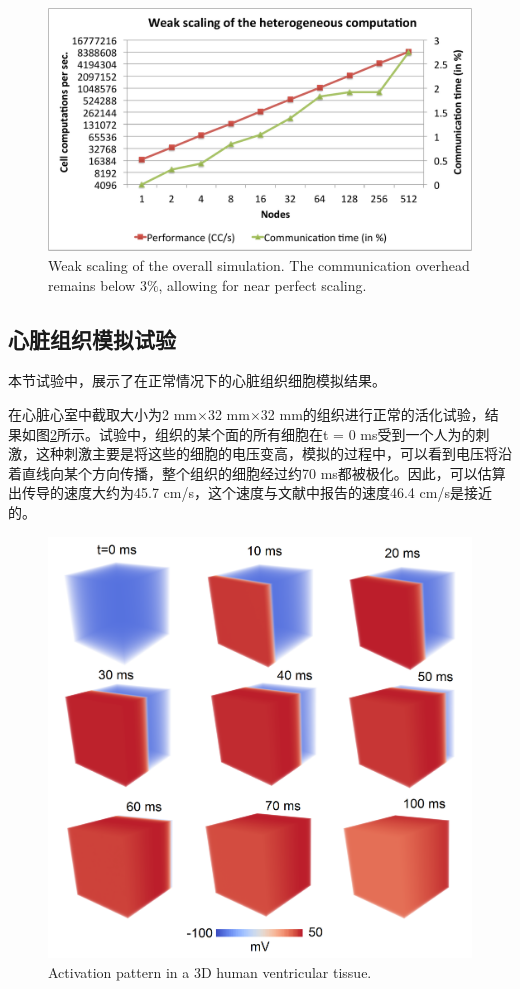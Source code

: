 \begin{figure}
 \includegraphics[width=\linewidth]{figs/weakscaling.pdf}
  \caption{Weak scaling of the overall simulation. The communication overhead remains below $3\%$, allowing for near perfect scaling.}
  \label{weak_scale}
\end{figure}

\subsection{心脏组织模拟试验}
本节试验中，展示了在正常情况下的心脏组织细胞模拟结果。

在心脏心室中截取大小为2 mm$\times$32 mm$\times$32 mm的组织进行正常的活化试验，结果如图\ref{fig:activation}所示。试验中，组织的某个面的所有细胞在t = 0 ms受到一个人为的刺激，这种刺激主要是将这些的细胞的电压变高，模拟的过程中，可以看到电压将沿着直线向某个方向传播，整个组织的细胞经过约70 ms都被极化。因此，可以估算出传导的速度大约为45.7 cm/s，这个速度与文献中报告的速度46.4 cm/s是接近的。

\begin{figure}
 \includegraphics[width=\linewidth]{figs/tissue_activation.png}
 \caption{Activation pattern in a 3D human ventricular tissue.}
 \label{fig:activation}
\end{figure}

